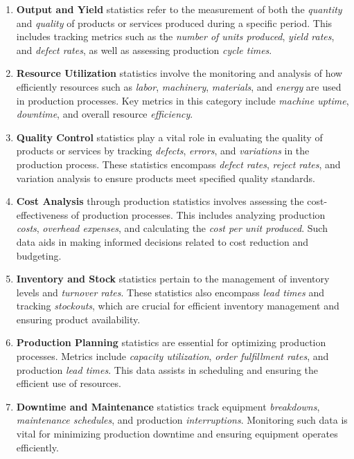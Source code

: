 \documentclass[
  a4paper,
]{scrbook}
\begin{document}
\begin{enumerate}
\def\labelenumi{\arabic{enumi}.}
\item
  \textbf{Output and Yield} statistics refer to the measurement of both
  the \emph{quantity} and \emph{quality} of products or services
  produced during a specific period. This includes tracking metrics such
  as the \emph{number of units produced}, \emph{yield rates}, and
  \emph{defect rates}, as well as assessing production \emph{cycle
  times}.
\item
  \textbf{Resource Utilization} statistics involve the monitoring and
  analysis of how efficiently resources such as \emph{labor},
  \emph{machinery}, \emph{materials}, and \emph{energy} are used in
  production processes. Key metrics in this category include
  \emph{machine uptime}, \emph{downtime}, and overall resource
  \emph{efficiency}.
\item
  \textbf{Quality Control} statistics play a vital role in evaluating
  the quality of products or services by tracking \emph{defects},
  \emph{errors}, and \emph{variations} in the production process. These
  statistics encompass \emph{defect rates}, \emph{reject rates}, and
  variation analysis to ensure products meet specified quality
  standards.
\item
  \textbf{Cost Analysis} through production statistics involves
  assessing the cost-effectiveness of production processes. This
  includes analyzing production \emph{costs}, \emph{overhead expenses},
  and calculating the \emph{cost per unit produced}. Such data aids in
  making informed decisions related to cost reduction and budgeting.
\item
  \textbf{Inventory and Stock} statistics pertain to the management of
  inventory levels and \emph{turnover rates}. These statistics also
  encompass \emph{lead times} and tracking \emph{stockouts}, which are
  crucial for efficient inventory management and ensuring product
  availability.
\item
  \textbf{Production Planning} statistics are essential for optimizing
  production processes. Metrics include \emph{capacity utilization},
  \emph{order fulfillment rates}, and production \emph{lead times}. This
  data assists in scheduling and ensuring the efficient use of
  resources.
\item
  \textbf{Downtime and Maintenance} statistics track equipment
  \emph{breakdowns}, \emph{maintenance schedules}, and production
  \emph{interruptions}. Monitoring such data is vital for minimizing
  production downtime and ensuring equipment operates efficiently.

\end{enumerate}
\end{document}
